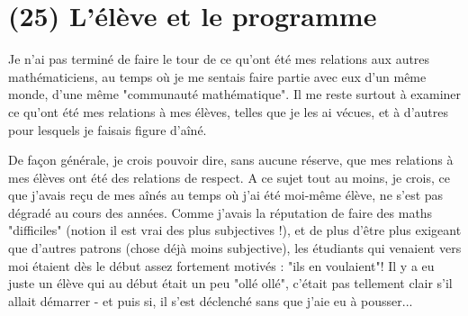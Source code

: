 \section{(25) L'élève et le programme}

Je n'ai pas terminé de faire le tour de ce qu'ont été mes relations aux autres mathématiciens, au temps où je me sentais faire partie avec eux d'un même monde, d'une même "communauté mathématique". Il me reste surtout à examiner ce qu'ont été mes relations à mes élèves, telles que je les ai vécues, et à d'autres pour lesquels je faisais figure d'aîné.

De façon générale, je crois pouvoir dire, sans aucune réserve, que mes relations à mes élèves ont été des relations de respect. A ce sujet tout au moins, je crois, ce que j'avais reçu de mes aînés au temps où j'ai été moi-même élève, ne s'est pas dégradé au cours des années. Comme j'avais la réputation de faire des maths "difficiles" (notion il est vrai des plus subjectives !), et de plus d'être plus exigeant que d'autres patrons (chose déjà moins subjective), les étudiants qui venaient vers moi étaient dès le début assez fortement motivés : "ils en voulaient"! Il y a eu juste un élève qui au début était un peu "ollé ollé", c'était pas tellement clair s'il allait démarrer - et puis si, il s'est déclenché sans que j'aie eu à pousser...

